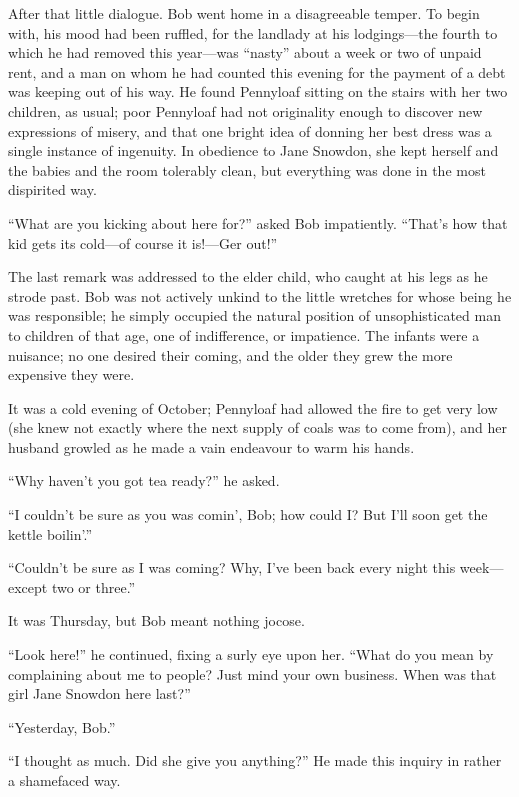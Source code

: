 After that little dialogue. Bob went home in a disagreeable temper. To
begin with, his mood had been ruffled, for the landlady at his
lodgings---the fourth to which he had removed this year---was ``nasty''
about a week or two of unpaid rent, and a man on whom he had counted
this evening for the payment of a debt was keeping out of his way. He
found Pennyloaf sitting on the stairs with her two children, as usual;
poor Pennyloaf had not originality enough to discover new expressions of
misery, and that one bright idea of donning her best dress was a single
instance of ingenuity. In obedience to Jane Snowdon, she kept herself
and the babies and the room tolerably clean, but everything was done in
the most dispirited way.

``What are you kicking about here for?'' asked Bob impatiently. ``That's
how that kid gets its cold---of course it is!---{Ger} out!''

{\protect\hypertarget{222}{}{}}The last remark was addressed to the
elder child, who caught at his legs as he strode past. Bob was not
actively unkind to the little wretches for whose being he was
responsible; he simply occupied the natural position of unsophisticated
man to children of that age, one of indifference, or impatience. The
infants were a nuisance; no one desired their coming, and the older they
grew the more expensive they were.

It was a cold evening of October; Pennyloaf had allowed the fire to get
very low (she knew not exactly where the next supply of coals was to
come from), and her husband growled as he made a vain endeavour to warm
his hands.

``Why haven't you got tea ready?'' he asked.

``I couldn't be sure as you was comin', Bob; how could I? But I'll soon
get the kettle boilin'.''

``Couldn't be sure as I was coming? Why, I've been back every night this
week---except two or three.''

{\protect\hypertarget{223}{}{}}It was Thursday, but Bob meant nothing
jocose.

``Look here!'' he continued, fixing a surly eye upon her. ``What do you
mean by complaining about me to people? Just mind your own business.
When was that girl Jane Snowdon here last?''

``Yesterday, Bob.''

``I thought as much. Did she give you anything?'' He made this inquiry
in rather a shamefaced way.

